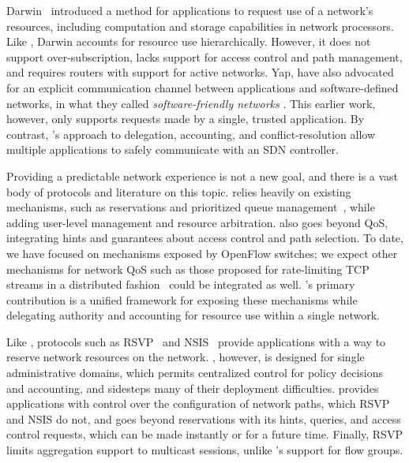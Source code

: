 Darwin~\cite{Darwin} introduced a method for
applications to request use of a network's resources, including
computation and storage capabilities in network processors. Like
\sys, Darwin accounts for resource use hierarchically. However, it
does not support over-subscription, lacks support for
access control and path management, and requires routers with
support for active networks.
%
Yap, \etal have also advocated for an explicit communication channel
between applications and software-defined networks,
in what they called \emph{software-friendly networks} \cite{Yap:2009}.
This earlier work, however, only supports requests made by a single,
trusted application. By contrast, \sys's approach to delegation,
accounting, and conflict-resolution allow multiple applications to
safely communicate with an SDN controller.






Providing a predictable network experience is not a new goal, and there is a
vast body of protocols and literature on this topic.  \sys relies
heavily on existing mechanisms, such as reservations and prioritized
queue management~\cite{Kim:2010,Stoica:1997}, while adding
user-level management and resource arbitration.
\sys also goes beyond QoS, integrating  hints
and guarantees about access control and path selection.
To date, we have focused on mechanisms exposed by OpenFlow
switches; we expect other mechanisms for network QoS %
such as those proposed
for rate-limiting TCP streams in a distributed fashion~\cite{Raghavan:2007}
could be integrated as well.
\sys's primary contribution is a unified framework for exposing these 
mechanisms while delegating authority
and accounting for resource use within a single network. 

Like \sys, protocols such as RSVP~\cite{rfc2205} and NSIS~\cite{rfc5974} 
provide applications with a way to
reserve network resources on the network. \sys, however, is designed
for single administrative domains, which permits centralized control for policy
decisions and accounting, and sidesteps many of their deployment difficulties. 
\sys provides applications with control over the configuration of network paths, which RSVP and NSIS do not, and goes beyond reservations
with its hints, queries, and access control requests, which can be made instantly or for a future
time. Finally, RSVP limits aggregation
support to multicast sessions, unlike \sys's support for flow groups. %

